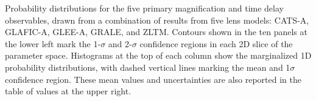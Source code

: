 Probability distributions for the five primary magnification and time
delay observables, drawn from a combination of results from five lens
models: CATS-A, GLAFIC-A, GLEE-A, GRALE, and ZLTM.  Contours shown in
the ten panels at the lower left mark the 1-$\sigma$ and 2-$\sigma$
confidence regions in each 2D slice of the parameter space. Histograms
at the top of each column show the marginalized 1D probability
distributions, with dashed vertical lines marking the mean and
1$\sigma$ confidence region.  These mean values and uncertainties are
also reported in the table of values at the upper right.
\label{fig:LensModelContours}
